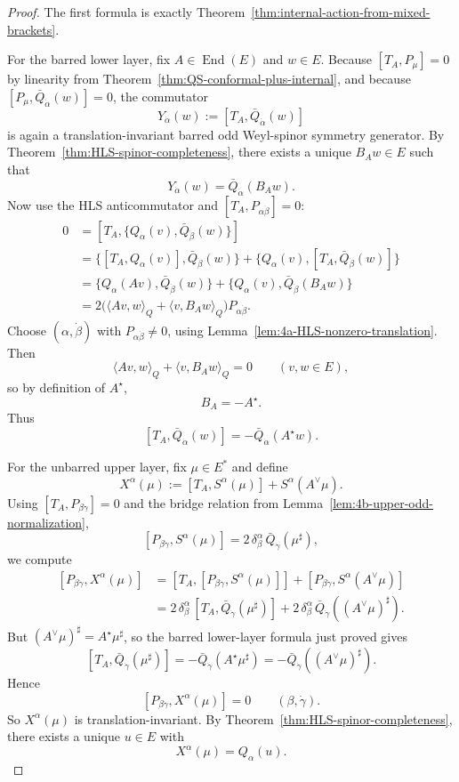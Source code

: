 \begin{proof}
The first formula is exactly
Theorem~\ref{thm:internal-action-from-mixed-brackets}.

For the barred lower layer, fix \(A\in\operatorname{End}(E)\) and \(w\in E\).
Because \([T_A,P_\mu]=0\) by linearity from
Theorem~\ref{thm:QS-conformal-plus-internal}, and because
\([P_\mu,\bar Q_{\dot\alpha}(w)]=0\), the commutator
\[
Y_{\dot\alpha}(w):=[T_A,\bar Q_{\dot\alpha}(w)]
\]
is again a translation-invariant barred odd Weyl-spinor symmetry generator.
By Theorem~\ref{thm:HLS-spinor-completeness}, there exists a unique
\(B_Aw\in E\) such that
\[
Y_{\dot\alpha}(w)=\bar Q_{\dot\alpha}(B_Aw).
\]
Now use the HLS anticommutator and \([T_A,P_{\alpha\dot\beta}]=0\):
\[
\begin{aligned}
0
&=
[T_A,\{Q_\alpha(v),\bar Q_{\dot\beta}(w)\}] \\
&=
\{[T_A,Q_\alpha(v)],\bar Q_{\dot\beta}(w)\}
+
\{Q_\alpha(v),[T_A,\bar Q_{\dot\beta}(w)]\} \\
&=
\{Q_\alpha(Av),\bar Q_{\dot\beta}(w)\}
+
\{Q_\alpha(v),\bar Q_{\dot\beta}(B_Aw)\} \\
&=
2\bigl(
\langle Av,w\rangle_Q+\langle v,B_Aw\rangle_Q
\bigr)P_{\alpha\dot\beta}.
\end{aligned}
\]
Choose \((\alpha,\dot\beta)\) with \(P_{\alpha\dot\beta}\neq 0\), using
Lemma~\ref{lem:4a-HLS-nonzero-translation}. Then
\[
\langle Av,w\rangle_Q+\langle v,B_Aw\rangle_Q=0
\qquad
(v,w\in E),
\]
so by definition of \(A^\star\),
\[
B_A=-A^\star.
\]
Thus
\[
[T_A,\bar Q_{\dot\alpha}(w)]
=
-\bar Q_{\dot\alpha}(A^\star w).
\]

For the unbarred upper layer, fix \(\mu\in E^*\) and define
\[
X^\alpha(\mu)
:=
[T_A,S^\alpha(\mu)]+S^\alpha(A^\vee\mu).
\]
Using \([T_A,P_{\beta\dot\gamma}]=0\) and the bridge relation from
Lemma~\ref{lem:4b-upper-odd-normalization},
\[
[P_{\beta\dot\gamma},S^\alpha(\mu)]
=
2\,\delta_\beta^\alpha\,\bar Q_{\dot\gamma}(\mu^\sharp),
\]
we compute
\[
\begin{aligned}
[P_{\beta\dot\gamma},X^\alpha(\mu)]
&=
[T_A,[P_{\beta\dot\gamma},S^\alpha(\mu)]]
+
[P_{\beta\dot\gamma},S^\alpha(A^\vee\mu)] \\
&=
2\,\delta_\beta^\alpha\,[T_A,\bar Q_{\dot\gamma}(\mu^\sharp)]
+
2\,\delta_\beta^\alpha\,\bar Q_{\dot\gamma}((A^\vee\mu)^\sharp).
\end{aligned}
\]
But \((A^\vee\mu)^\sharp=A^\star\mu^\sharp\), so the barred lower-layer formula
just proved gives
\[
[T_A,\bar Q_{\dot\gamma}(\mu^\sharp)]
=
-\bar Q_{\dot\gamma}(A^\star\mu^\sharp)
=
-\bar Q_{\dot\gamma}((A^\vee\mu)^\sharp).
\]
Hence
\[
[P_{\beta\dot\gamma},X^\alpha(\mu)]=0
\qquad
(\beta,\dot\gamma).
\]
So \(X^\alpha(\mu)\) is translation-invariant. By
Theorem~\ref{thm:HLS-spinor-completeness}, there exists a unique \(u\in E\) with
\[
X^\alpha(\mu)=Q_\alpha(u).
\]


\end{proof}
